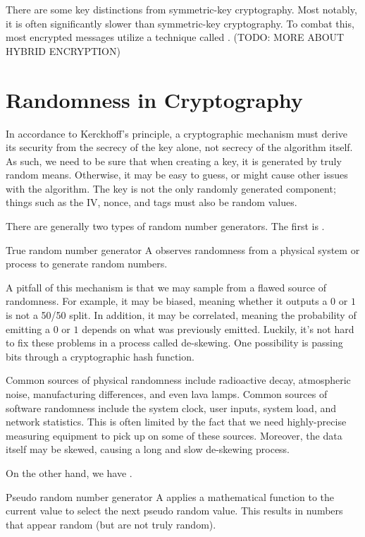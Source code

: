 There are some key distinctions from symmetric-key cryptography. Most notably, it is often significantly slower than symmetric-key cryptography. To combat this, most encrypted messages utilize a technique called . (TODO: MORE ABOUT HYBRID ENCRYPTION)

\section{Randomness in Cryptography}
In accordance to Kerckhoff's principle, a cryptographic mechanism must derive its security from the secrecy of the key alone, not secrecy of the algorithm itself. As such, we need to be sure that when creating a key, it is generated by truly random means. Otherwise, it may be easy to guess, or might cause other issues with the algorithm. The key is not the only randomly generated component; things such as the IV, nonce, and tags must also be random values.

There are generally two types of random number generators. The first is .

\begin{dfnbox}{True random number generator}{}
    A  observes randomness from a physical system or process to generate random numbers.
\end{dfnbox}

A pitfall of this mechanism is that we may sample from a flawed source of randomness. For example, it may be biased, meaning whether it outputs a $0$ or $1$ is not a 50/50 split. In addition, it may be correlated, meaning the probability of emitting a $0$ or $1$ depends on what was previously emitted. Luckily, it's not hard to fix these problems in a process called de-skewing. One possibility is passing bits through a cryptographic hash function.

Common sources of physical randomness include radioactive decay, atmospheric noise, manufacturing differences, and even lava lamps. Common sources of software randomness include the system clock, user inputs, system load, and network statistics. This is often limited by the fact that we need highly-precise measuring equipment to pick up on some of these sources. Moreover, the data itself may be skewed, causing a long and slow de-skewing process.

On the other hand, we have .

\begin{dfnbox}{Pseudo random number generator}{}
    A  applies a mathematical function to the current value to select the next pseudo random value. This results in numbers that appear random (but are not truly random).
\end{dfnbox}

